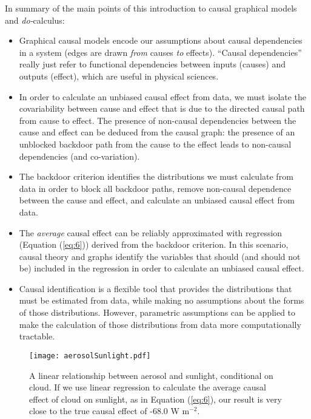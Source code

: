 \documentclass[12pt]{article}
\begin{document}
In summary of the main points of this introduction to causal graphical
models and \textit{do-}calculus:

\begin{itemize}
\item Graphical causal models encode our assumptions about causal
  dependencies in a system (edges are drawn \emph{from} causes \emph{to}
  effects). ``Causal dependencies'' really just refer to functional
  dependencies between inputs (causes) and outputs (effect), which are
  useful in physical sciences.
\item In order to calculate an unbiased causal effect from data, we
  must isolate the covariability between cause and effect that is due to
  the directed causal path from cause to effect. The presence of
  non-causal dependencies between the cause and effect can be deduced
  from the causal graph: the presence of an unblocked backdoor path from
  the cause to the effect leads to non-causal dependencies (and
  co-variation).
\item The backdoor criterion identifies the distributions we must
  calculate from data in order to block all backdoor paths, remove
  non-causal dependence between the cause and effect, and calculate an
  unbiased causal effect from data.
\item The \emph{average} causal effect can be reliably approximated
  with regression (Equation (\ref{eq:6})) derived from the backdoor
  criterion. In this scenario, causal theory and graphs identify the
  variables that should (and should not be) included in the regression
  in order to calculate an unbiased causal effect.
\item Causal identification is a flexible tool that provides the
  distributions that must be estimated from data, while making no
  assumptions about the forms of those distributions. However,
  parametric assumptions can be applied to make the calculation of those
  distributions from data more computationally tractable.
\end{itemize}

\begin{figure} \texttt{[image: aerosolSunlight.pdf]}
  \caption{A linear relationship between aerosol and sunlight,
    conditional on cloud. If we use linear regression to calculate the
    average causal effect of cloud on sunlight, as in Equation
    (\ref{eq:6}), our result is very close to the true causal effect of
    -68.0 W m$^{-2}$.}
  \label{fig:linear}
\end{figure}
\end{document}
